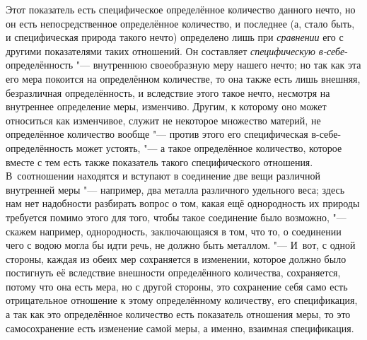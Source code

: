 Этот показатель есть специфическое определённое количество данного нечто, но он
есть непосредственное определённое количество, и последнее (а, стало быть, и
специфическая природа такого нечто) определено лишь при {\em сравнении} его с
другими показателями таких отношений. Он составляет {\em специфическую
в-себе}-определённость "--- внутреннюю своеобразную меру нашего нечто; но так
как эта его мера покоится на определённом количестве, то она также есть лишь
внешняя, безразличная определённость, и вследствие этого такое нечто, несмотря
на внутреннее определение меры, изменчиво. Другим, к которому оно может
относиться как изменчивое, служит не некоторое множество материй, не
определённое количество вообще "--- против этого его специфическая
в-себе-определённость может устоять, "--- а такое определённое количество,
которое вместе с тем есть также показатель такого специфического отношения.
В~соотношении находятся и вступают в соединение две вещи различной внутренней
меры "--- например, два металла различного удельного веса; здесь нам нет
надобности разбирать вопрос о том, какая ещё однородность их природы требуется
помимо этого для того, чтобы такое соединение было возможно, "--- скажем
например, однородность, заключающаяся в том, что то, о соединении чего с водою
могла бы идти речь, не должно быть металлом. "--- И~вот, с одной стороны,
каждая из обеих мер сохраняется в изменении, которое должно было постигнуть её
вследствие внешности определённого количества, сохраняется, потому что она есть
мера, но с другой стороны, это сохранение себя само есть отрицательное
отношение к этому определённому количеству, его спецификация, а так как это
определённое количество есть показатель отношения меры, то это самосохранение
есть изменение самой меры, а именно, взаимная спецификация.

